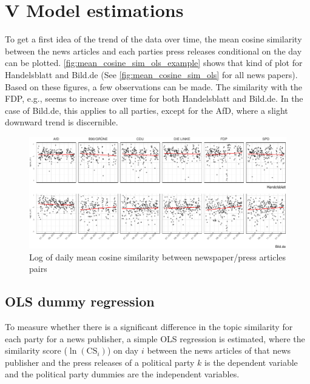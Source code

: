 \documentclass[
]{article}
\begin{document}
\hypertarget{v-model-estimations}{%
\section{V Model estimations}\label{v-model-estimations}}

To get a first idea of the trend of the data over time, the mean cosine
similarity between the news articles and each parties press releases
conditional on the day can be plotted.
\autoref{fig:mean_cosine_sim_ols_example} shows that kind of plot for
Handelsblatt and Bild.de (See \autoref{fig:mean_cosine_sim_ols} for all
news papers). Based on these figures, a few observations can be made.
The similarity with the FDP, e.g., seems to increase over time for both
Handelsblatt and Bild.de. In the case of Bild.de, this applies to all
parties, except for the AfD, where a slight downward trend is
discernible.

\begin{figure}

{\centering \includegraphics[width=0.9\linewidth]{main_text_files/figure-latex/Daily mean cosine similarity - example-1} 

}

\caption{Log of daily mean cosine similarity between newspaper/press articles pairs \label{fig:mean_cosine_sim_ols_example}}\label{fig:Daily mean cosine similarity - example}
\end{figure}

\hypertarget{ols-dummy-regression}{%
\subsection{OLS dummy regression}\label{ols-dummy-regression}}

To measure whether there is a significant difference in the topic
similarity for each party for a news publisher, a simple OLS regression
is estimated, where the similarity score (\(\ln(\text{CS}_{i})\)) on day
\(i\) between the news articles of that news publisher and the press
releases of a political party \(k\) is the dependent variable and the
political party dummies are the independent variables.
\end{document}
